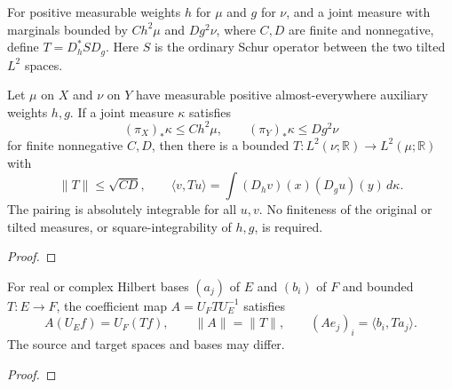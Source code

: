 \begin{supporting}
\begin{definition}
\label{def:two-weight-schur-l2}
\leanok
For positive measurable weights $h$ for $\mu$ and $g$ for $\nu$, and a joint
measure with marginals bounded by $C h^2\mu$ and $D g^2\nu$, where $C,D$ are
finite and nonnegative, define $T=D_h^* S D_g$. Here $S$ is the ordinary Schur
operator between the two tilted $L^2$ spaces.
\end{definition}

\begin{theorem}
\label{thm:two-weight-schur-l2}
\leanok
Let $\mu$ on $X$ and $\nu$ on $Y$ have measurable positive almost-everywhere
auxiliary weights $h,g$. If a joint measure $\kappa$ satisfies
\[
 (\pi_X)_*\kappa\le C h^2\mu,\qquad
 (\pi_Y)_*\kappa\le D g^2\nu
\]
for finite nonnegative $C,D$, then there is a bounded
$T:L^2(\nu;\mathbb R)\to L^2(\mu;\mathbb R)$ with
\[
 \|T\|\le\sqrt{CD},\qquad
 \langle v,Tu\rangle=\int (D_hv)(x)(D_gu)(y)\,d\kappa.
\]
The pairing is absolutely integrable for all $u,v$. No finiteness of the
original or tilted measures, or square-integrability of $h,g$, is required.
\end{theorem}
\begin{proof}
\leanok
\end{proof}

\begin{theorem}
\label{thm:hilbert-coordinate-map}
\leanok
For real or complex Hilbert bases $(a_j)$ of $E$ and $(b_i)$ of $F$ and
bounded $T:E\to F$, the coefficient map $A=U_F T U_E^{-1}$ satisfies
\[
 A(U_E f)=U_F(Tf),\qquad \|A\|=\|T\|,\qquad
 (Ae_j)_i=\langle b_i,Ta_j\rangle.
\]
The source and target spaces and bases may differ.
\end{theorem}
\begin{proof}
\leanok
\end{proof}


\end{supporting}
